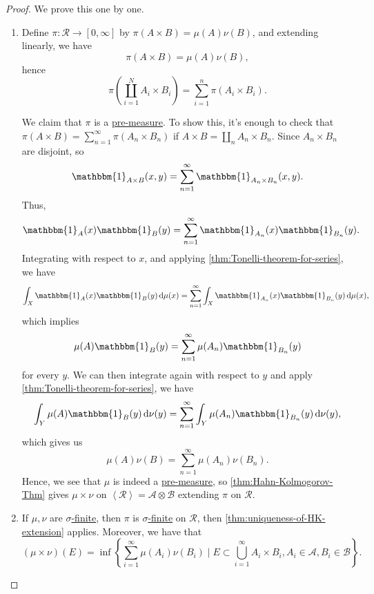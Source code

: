 \begin{proof}
	We prove this one by one.
	\begin{enumerate}[(1)]
		\item Define \(\pi \colon \mathcal{R} \to [0, \infty ]\) by \(\pi (A \times B) = \mu (A)\nu (B)\), and extending linearly, we have
		      \[
			      \pi (A\times B) = \mu (A)\nu (B),
		      \]
		      hence
		      \[
			      \pi \left(\coprod_{i=1}^{N} A_{i} \times B_{i} \right) = \sum_{i=1}^{n} \pi (A_{i} \times B_{i}).
		      \]

		      We claim that \(\pi \) is a \hyperref[def:pre-measure]{pre-measure}. To show this, it's enough to check that \(\pi (A\times B) = \sum_{n=1}^{\infty} \pi (A_{n} \times B_{n} )\)
		      if \(A\times B = \coprod_{n}A_{n} \times B_{n}  \). Since \(A_{n} \times B_{n} \) are disjoint, so
		      \[
			      \mathbbm{1}_{A\times B}(x, y) = \sum_{n=1}^{\infty} \mathbbm{1}_{A_{n} \times B_{n} }(x, y).
		      \]
		      Thus,
		      \[
			      \mathbbm{1}_{A} (x)\mathbbm{1}_{B} (y) = \sum_{n=1}^{\infty} \mathbbm{1}_{A_{n} }(x)\mathbbm{1}_{B_{n}}(y).
		      \]
		      Integrating with respect to \(x\), and applying \autoref{thm:Tonelli-theorem-for-series}, we have
		      \[
			      \int _X \mathbbm{1}_{A} (x)\mathbbm{1}_{B}(y)\,\mathrm{d} \mu (x) = \sum_{n=1}^{\infty} \int _X \mathbbm{1}_{A_{n} }(x)\mathbbm{1}_{B_{n} }(y)\,\mathrm{d} \mu (x),
		      \]
		      which implies
		      \[
			      \mu (A)\mathbbm{1}_{B} (y) = \sum_{n=1}^{\infty} \mu (A_{n} )\mathbbm{1}_{B_{n} }(y)
		      \]
		      for every \(y\). We can then integrate again with respect to \(y\) and apply \autoref{thm:Tonelli-theorem-for-series}, we have
		      \[
			      \int _Y \mu (A)\mathbbm{1}_{B}(y)\,\mathrm{d} \nu (y) = \sum_{n=1}^{\infty} \int _Y \mu (A_{n} )\mathbbm{1}_{B_{n} }(y)\,\mathrm{d} \nu (y),
		      \]
		      which gives us
		      \[
			      \mu (A)\nu (B) = \sum_{n=1}^{\infty} \mu (A_{n} )\nu (B_{n} ).
		      \]
		      Hence, we see that \(\mu\) is indeed a \hyperref[def:pre-measure]{pre-measure}, so  \autoref{thm:Hahn-Kolmogorov-Thm} gives \(\mu \times \nu \) on \(\left< \mathcal{R}  \right> = \mathcal{A} \otimes \mathcal{B}  \)
		      extending \(\pi \) on \(\mathcal{R} \).
		\item If \(\mu , \nu \) are \hyperref[def:sigma-finite-measure]{\(\sigma\)-finite}, then \(\pi \) is  \hyperref[def:sigma-finite-measure]{\(\sigma\)-finite} on \(\mathcal{R} \), then
		      \autoref{thm:uniqueness-of-HK-extension} applies. Moreover, we have that
		      \[
			      (\mu \times \nu )(E) = \inf \left\{\sum_{i=1}^{\infty} \mu (A_{i})\nu (B_{i})\mid E\subset \bigcup_{i=1}^{\infty} A_{i} \times B_{i}, A_{i} \in \mathcal{A} , B_{i} \in \mathcal{B} \right\}.
		      \]
	\end{enumerate}
\end{proof}


